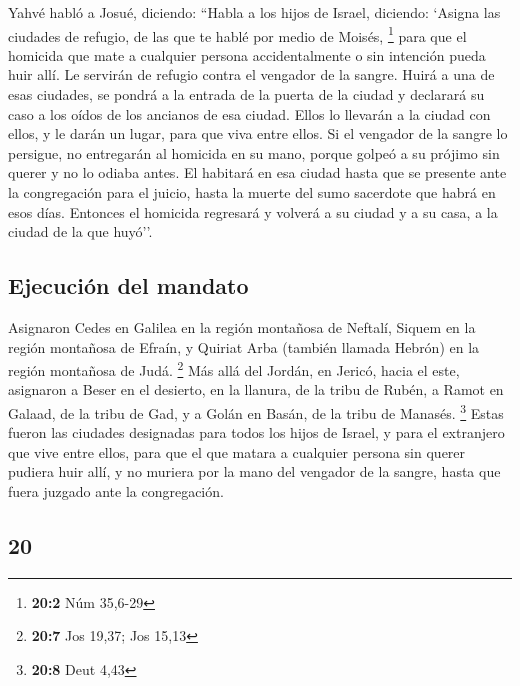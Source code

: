 \begin{paracol}{2}
 Yahvé habló a Josué, diciendo:  ``Habla a
los hijos de Israel, diciendo: `Asigna las ciudades de refugio, de las
que te hablé por medio de Moisés, \footnote{\textbf{20:2} Núm 35,6-29}
 para que el homicida que mate a cualquier persona
accidentalmente o sin intención pueda huir allí. Le servirán de refugio
contra el vengador de la sangre.  Huirá a una de esas
ciudades, se pondrá a la entrada de la puerta de la ciudad y declarará
su caso a los oídos de los ancianos de esa ciudad. Ellos lo llevarán a
la ciudad con ellos, y le darán un lugar, para que viva entre ellos.
 Si el vengador de la sangre lo persigue, no entregarán al
homicida en su mano, porque golpeó a su prójimo sin querer y no lo
odiaba antes.  El habitará en esa ciudad hasta que se
presente ante la congregación para el juicio, hasta la muerte del sumo
sacerdote que habrá en esos días. Entonces el homicida regresará y
volverá a su ciudad y a su casa, a la ciudad de la que huyó''.

\hypertarget{ejecuciuxf3n-del-mandato}{%
\subsection{Ejecución del mandato}\label{ejecuciuxf3n-del-mandato}}

 Asignaron Cedes en Galilea en la región montañosa de
Neftalí, Siquem en la región montañosa de Efraín, y Quiriat Arba
(también llamada Hebrón) en la región montañosa de Judá. \footnote{\textbf{20:7}
  Jos 19,37; Jos 15,13}  Más allá del Jordán, en Jericó,
hacia el este, asignaron a Beser en el desierto, en la llanura, de la
tribu de Rubén, a Ramot en Galaad, de la tribu de Gad, y a Golán en
Basán, de la tribu de Manasés. \footnote{\textbf{20:8} Deut 4,43}
 Estas fueron las ciudades designadas para todos los hijos
de Israel, y para el extranjero que vive entre ellos, para que el que
matara a cualquier persona sin querer pudiera huir allí, y no muriera
por la mano del vengador de la sangre, hasta que fuera juzgado ante la
congregación.

\switchcolumn
\begin{otherlanguage}{english}

\hypertarget{section-39}{%
\section{20}\label{section-39}}


\end{otherlanguage}
\end{paracol}
